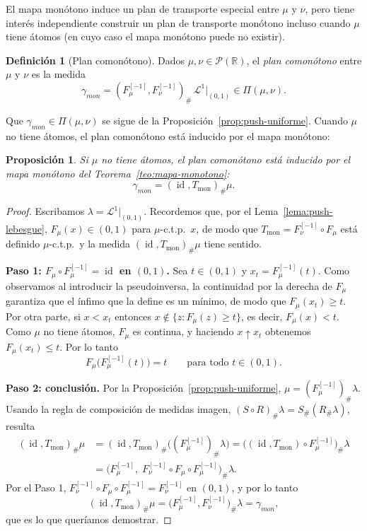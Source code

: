 \documentclass[12pt, a4paper]{amsbook}
\newcommand{\id}{\operatorname{id}}
\newcommand{\R}{{\mathbb R}}
\newtheorem{prop}[teo]{Proposición}
\theoremstyle{remark}
\theoremstyle{definition}
\newtheorem{defi}[teo]{Definición}
\numberwithin{section}{chapter}
\numberwithin{subsection}{section}
\numberwithin{equation}{section}
\numberwithin{figure}{chapter}
\begin{document}
El mapa monótono induce un plan de transporte especial entre $\mu$ y $\nu$, pero
tiene interés independiente construir un plan de transporte monótono incluso cuando
$\mu$ tiene átomos (en cuyo caso el mapa monótono puede no existir).

\begin{defi}[Plan comonótono]
Dados $\mu,\nu\in\mathcal P(\R)$, el \emph{plan comonótono} entre $\mu$ y $\nu$
es la medida
\[
\gamma_{mon}
=
(F_\mu^{[-1]},F_\nu^{[-1]})_\#\,\mathcal L^1|_{(0,1)}
\in\Pi(\mu,\nu).
\]
\end{defi}

Que $\gamma_{mon}\in\Pi(\mu,\nu)$ se sigue de la Proposición~\ref{prop:push-uniforme}.
Cuando $\mu$ no tiene átomos, el plan comonótono está inducido por el mapa
monótono:
\begin{prop}\label{prop:comonotono-mapa}
Si $\mu$ no tiene átomos, el plan comonótono está inducido por el mapa
monótono del Teorema~\ref{teo:mapa-monotono}:
\[
\gamma_{mon}=(\id,T_\text{mon})_\#\mu .
\]
\end{prop}

\begin{proof}
Escribamos $\lambda=\mathcal L^1|_{(0,1)}$. Recordemos que, por el
Lema~\ref{lema:push-lebesgue}, $F_\mu(x)\in(0,1)$ para $\mu$-c.t.p.\ $x$, de
modo que $T_\text{mon}=F_\nu^{[-1]}\circ F_\mu$ está definido $\mu$-c.t.p.\ y la
medida $(\id,T_\text{mon})_\#\mu$ tiene sentido.

\medskip
\textbf{Paso 1: $F_\mu\circ F_\mu^{[-1]}=\id$ en $(0,1)$.}
Sea $t\in(0,1)$ y $x_t=F_\mu^{[-1]}(t)$. Como observamos al introducir la
pseudoinversa, la continuidad por la derecha de $F_\mu$ garantiza que el
ínfimo que la define es un mínimo, de modo que $F_\mu(x_t)\ge t$. Por otra
parte, si $x<x_t$ entonces $x\notin\{z:F_\mu(z)\ge t\}$, es decir,
$F_\mu(x)<t$. Como $\mu$ no tiene átomos, $F_\mu$ es continua, y haciendo
$x\uparrow x_t$ obtenemos $F_\mu(x_t)\le t$. Por lo tanto
\[
F_\mu\bigl(F_\mu^{[-1]}(t)\bigr)=t
\qquad\text{para todo }t\in(0,1).
\]

\medskip
\textbf{Paso 2: conclusión.}
Por la Proposición~\ref{prop:push-uniforme}, $\mu=(F_\mu^{[-1]})_\#\lambda$.
Usando la regla de composición de medidas imagen,
$(S\circ R)_\#\lambda=S_\#(R_\#\lambda)$, resulta
\[
\begin{aligned}
(\id,T_\text{mon})_\#\mu
&=(\id,T_\text{mon})_\#\bigl((F_\mu^{[-1]})_\#\lambda\bigr)
=\bigl((\id,T_\text{mon})\circ F_\mu^{[-1]}\bigr)_\#\lambda\\
&=\bigl(F_\mu^{[-1]},\;F_\nu^{[-1]}\circ F_\mu\circ F_\mu^{[-1]}\bigr)_\#\lambda .
\end{aligned}
\]
Por el Paso 1, $F_\nu^{[-1]}\circ F_\mu\circ F_\mu^{[-1]}=F_\nu^{[-1]}$ en
$(0,1)$, y por lo tanto
\[
(\id,T_\text{mon})_\#\mu
=\bigl(F_\mu^{[-1]},F_\nu^{[-1]}\bigr)_\#\lambda
=\gamma_{mon},
\]
que es lo que queríamos demostrar.
\end{proof}
\end{document}
